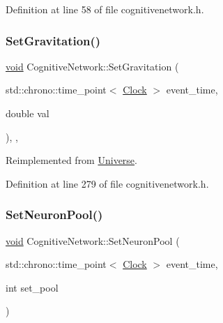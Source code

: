 Definition at line 58 of file cognitivenetwork.\+h.

\mbox{\label{class_cognitive_network_af9f082a70f0cc25a3f818d9eace5a527}} 
\subsubsection{\texorpdfstring{Set\+Gravitation()}{SetGravitation()}}
{\footnotesize\ttfamily \mbox{\hyperlink{glad_8h_a950fc91edb4504f62f1c577bf4727c29}{void}} Cognitive\+Network\+::\+Set\+Gravitation (\begin{DoxyParamCaption}\item[{std\+::chrono\+::time\+\_\+point$<$ \mbox{\hyperlink{universe_8h_a0ef8d951d1ca5ab3cfaf7ab4c7a6fd80}{Clock}} $>$}]{event\+\_\+time,  }\item[{double}]{val }\end{DoxyParamCaption})\hspace{0.3cm}{\ttfamily [inline]}, {\ttfamily [final]}, {\ttfamily [virtual]}}



Reimplemented from \mbox{\hyperlink{class_universe_ae0cb8d86b2fbb8396d605160344b42f5}{Universe}}.



Definition at line 279 of file cognitivenetwork.\+h.

\mbox{\label{class_cognitive_network_a2e1137387c4165dd3f91a758d2ce7f34}} 
\subsubsection{\texorpdfstring{Set\+Neuron\+Pool()}{SetNeuronPool()}}
{\footnotesize\ttfamily \mbox{\hyperlink{glad_8h_a950fc91edb4504f62f1c577bf4727c29}{void}} Cognitive\+Network\+::\+Set\+Neuron\+Pool (\begin{DoxyParamCaption}\item[{std\+::chrono\+::time\+\_\+point$<$ \mbox{\hyperlink{universe_8h_a0ef8d951d1ca5ab3cfaf7ab4c7a6fd80}{Clock}} $>$}]{event\+\_\+time,  }\item[{int}]{set\+\_\+pool }\end{DoxyParamCaption})\hspace{0.3cm}{\ttfamily [inline]}}



